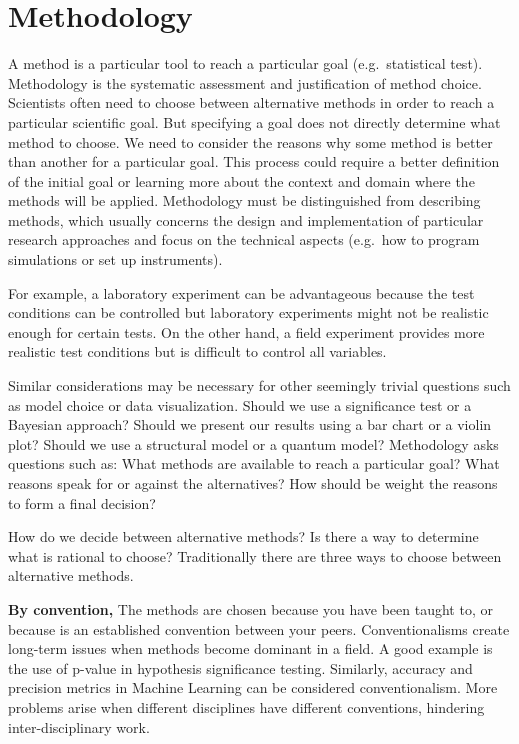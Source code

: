 \documentclass[
]{book}
\begin{document}
\hypertarget{methodology}{%
\section{Methodology}\label{methodology}}

A method is a particular tool to reach a particular goal (e.g.~statistical test). Methodology is the systematic assessment and justification of method choice. Scientists often need to choose between alternative methods in order to reach a particular scientific goal. But specifying a goal does not directly determine what method to choose. We need to consider the reasons why some method is better than another for a particular goal. This process could require a better definition of the initial goal or learning more about the context and domain where the methods will be applied. Methodology must be distinguished from describing methods, which usually concerns the design and implementation of particular research approaches and focus on the technical aspects (e.g.~how to program simulations or set up instruments).

For example, a laboratory experiment can be advantageous because the test conditions can be controlled but laboratory experiments might not be realistic enough for certain tests. On the other hand, a field experiment provides more realistic test conditions but is difficult to control all variables.

Similar considerations may be necessary for other seemingly trivial questions such as model choice or data visualization. Should we use a significance test or a Bayesian approach? Should we present our results using a bar chart or a violin plot? Should we use a structural model or a quantum model? Methodology asks questions such as: What methods are available to reach a particular goal? What reasons speak for or against the alternatives? How should be weight the reasons to form a final decision?

How do we decide between alternative methods? Is there a way to determine what is rational to choose?
Traditionally there are three ways to choose between alternative methods.

\textbf{By convention,} The methods are chosen because you have been taught to, or because is an established convention between your peers. Conventionalisms create long-term issues when methods become dominant in a field. A good example is the use of p-value in hypothesis significance testing. Similarly, accuracy and precision metrics in Machine Learning can be considered conventionalism. More problems arise when different disciplines have different conventions, hindering inter-disciplinary work.
\end{document}
